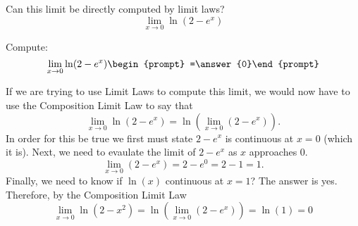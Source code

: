 \documentclass{ximera}
\begin{document}
\begin{question}
  Can this limit be directly computed by limit laws?
  \[
  \lim_{x\to 0}\ln(2-e^x)
  \]
  \begin{prompt}
  \begin{multipleChoice}
  \end{multipleChoice}
  \begin{question}
    Compute:
    \[
    \lim_{x\to 0}\ln(2-e^x)\begin{prompt} =\answer{0}\end{prompt}
    \]
    \begin{feedback}
      If we are trying to use Limit Laws to compute this limit, we
      would now have to use the Composition Limit Law to say that
      \[
      \lim_{x\to 0} \ln(2-e^x) = \ln\left(\lim_{x\to 0}(2-e^x)\right).
      \]
      In order for this be true we first must state $2-e^x$ is continuous at $x=0$ (which it is). Next, we need to evaulate the limit of $2-e^x$ as $x$ approaches $0$.
      $$
      \lim_{x\to 0}\left(2-e^x\right) = 2-e^0=2-1=1.
      $$
      Finally, we need to know if $\ln(x)$ continuous at $x=1$? The answer is yes. Therefore, by the Composition Limit Law
      $$
        \lim_{x\to 0}\ln(2-x^2) = \ln(\lim_{x\to 0}(2-e^x)) = \ln(1)=0
      $$
    \end{feedback}
  \end{question}
  \end{prompt}
\end{question}
\end{document}
